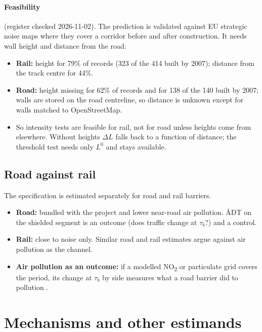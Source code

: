 \documentclass[11pt]{article}
\begin{document}
\paragraph{Feasibility} (register checked 2026-11-02). The prediction is validated against EU
strategic noise maps where they cover a corridor before and after construction. It needs wall
height and distance from the road:
\begin{itemize}
\item \textbf{Rail:} height for 79\% of records (323 of the 414 built by 2007); distance from the
  track centre for 44\%.
\item \textbf{Road:} height missing for 62\% of records and for 138 of the 140 built by 2007;
  walls are stored on the road centreline, so distance is unknown except for walls matched to
  OpenStreetMap.
\item So intensity tests are feasible for rail, not for road unless heights come from elsewhere.
  Without heights \(\Delta L\) falls back to a function of distance; the threshold test needs
  only \(L^0\) and stays available.
\end{itemize}

\subsection{Road against rail}

The specification is estimated separately for road and rail barriers.
\begin{itemize}
\item \textbf{Road:} bundled with the project and lower near-road air pollution. ÅDT on the
  shielded segment is an outcome (does traffic change at \(\tau_b\)?) and a control.
\item \textbf{Rail:} close to noise only. Similar road and rail estimates argue against air
  pollution as the channel.
\item \textbf{Air pollution as an outcome:} if a modelled NO\textsubscript{2} or particulate grid
  covers the period, its change at \(\tau_b\) by side measures what a road barrier did to
  pollution \autocite[the analogues in the lead studies are traffic metals in moss and industrial
  emissions:][]{gronqvistUnderstandingHowLow2020,hollingsworthThousandCutsCumulative2025}.
\end{itemize}

\section{Mechanisms and other estimands}\label{sec:mechanisms}
\end{document}
